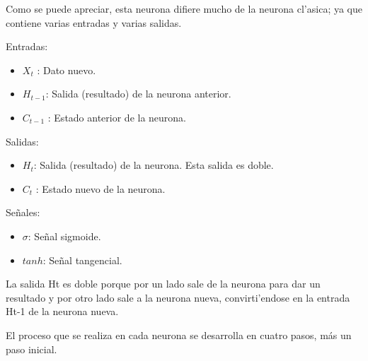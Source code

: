 
Como se puede apreciar, esta neurona difiere mucho de la neurona cl'asica; ya que contiene varias entradas y varias salidas.



Entradas:
\begin{itemize}
\item $  X_{t} $ : Dato nuevo.
\item $ H_{t-1} $: Salida (resultado) de la neurona anterior.
\item $ C_{t-1} $ : Estado anterior de la neurona.
\end{itemize}

Salidas:
\begin{itemize}
\item $ H_{t} $: Salida (resultado) de la neurona. Esta salida es doble.
\item $ C_{t} $ : Estado nuevo de la neurona.
\end{itemize}

Señales:
\begin{itemize}
\item $ \sigma $: Señal sigmoide.
\item $ tanh $: Señal tangencial.
\end{itemize}

\clearpage


La salida Ht es doble porque  por un lado sale de la neurona para dar un resultado  y por otro lado sale a la neurona nueva, convirti'endose en la entrada Ht-1 de la neurona nueva.

El proceso que se realiza en cada neurona se desarrolla en cuatro pasos, más un paso inicial.

